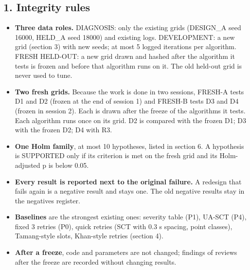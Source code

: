 \subsection*{1. Integrity rules}
\begin{itemize}
\item \textbf{Three data roles.} DIAGNOSIS: only the existing grids (DESIGN\_A seed 16000, HELD\_A seed 18000) and existing logs. DEVELOPMENT: a new grid (section 3) with new seeds; at most 5 logged iterations per algorithm. FRESH HELD-OUT: a new grid drawn and hashed after the algorithm it tests is frozen and before that algorithm runs on it. The old held-out grid is never used to tune.
\item \textbf{Two fresh grids.} Because the work is done in two sessions, FRESH-A tests D1 and D2 (frozen at the end of session 1) and FRESH-B tests D3 and D4 (frozen in session 2). Each is drawn after the freeze of the algorithms it tests. Each algorithm runs once on its grid. D2 is compared with the frozen D1; D3 with the frozen D2; D4 with R3.
\item \textbf{One Holm family}, at most 10 hypotheses, listed in section 6. A hypothesis is SUPPORTED only if its criterion is met on the fresh grid and its Holm-adjusted p is below 0.05.
\item \textbf{Every result is reported next to the original failure.} A redesign that fails again is a negative result and stays one. The old negative results stay in the negatives register.
\item \textbf{Baselines} are the strongest existing ones: severity table (P1), UA-SCT (P4), fixed 3 retries (P0), quick retries (SCT with 0.3 s spacing, point classes), Tamang-style slots, Khan-style retries (section 4).
\item \textbf{After a freeze}, code and parameters are not changed; findings of reviews after the freeze are recorded without changing results.
\end{itemize}

